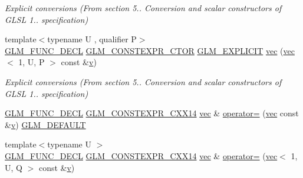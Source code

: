 \begin{DoxyCompactItemize}
\begin{DoxyCompactList}\small\item\em Explicit conversions (From section 5.. Conversion and scalar constructors of G\+L\+SL 1.. specification) \end{DoxyCompactList}\item 
{\footnotesize template$<$typename U , qualifier P$>$ }\\\mbox{\hyperlink{setup_8hpp_ab2d052de21a70539923e9bcbf6e83a51}{G\+L\+M\+\_\+\+F\+U\+N\+C\+\_\+\+D\+E\+CL}} \mbox{\hyperlink{setup_8hpp_ad34178a09666081abdb573c14d1f4a5a}{G\+L\+M\+\_\+\+C\+O\+N\+S\+T\+E\+X\+P\+R\+\_\+\+C\+T\+OR}} \mbox{\hyperlink{setup_8hpp_a6c74f5a5e7b134ab69023ff9a30d4d5d}{G\+L\+M\+\_\+\+E\+X\+P\+L\+I\+C\+IT}} \mbox{\hyperlink{structglm_1_1vec_3_011_00_01_t_00_01_q_01_4_abd93e6bf42d506d85f4aea0c5d92ecc2}{vec}} (\mbox{\hyperlink{structglm_1_1vec}{vec}}$<$ 1, U, P $>$ const \&\mbox{\hyperlink{_s_d_l__opengl_8h_a10a82eabcb59d2fcd74acee063775f90}{v}})
\begin{DoxyCompactList}\small\item\em Explicit conversions (From section 5.. Conversion and scalar constructors of G\+L\+SL 1.. specification) \end{DoxyCompactList}\item 
\mbox{\hyperlink{setup_8hpp_ab2d052de21a70539923e9bcbf6e83a51}{G\+L\+M\+\_\+\+F\+U\+N\+C\+\_\+\+D\+E\+CL}} \mbox{\hyperlink{setup_8hpp_a4dd12abf5e1164bc57f3a34671d03844}{G\+L\+M\+\_\+\+C\+O\+N\+S\+T\+E\+X\+P\+R\+\_\+\+C\+X\+X14}} \mbox{\hyperlink{structglm_1_1vec}{vec}} \& \mbox{\hyperlink{structglm_1_1vec_3_011_00_01_t_00_01_q_01_4_ac0ab0e9e96caa507674d12526367ea11}{operator=}} (\mbox{\hyperlink{structglm_1_1vec}{vec}} const \&\mbox{\hyperlink{_s_d_l__opengl_8h_a10a82eabcb59d2fcd74acee063775f90}{v}}) \mbox{\hyperlink{setup_8hpp_aefce7051c376a64ba89fa93a9f63bc2c}{G\+L\+M\+\_\+\+D\+E\+F\+A\+U\+LT}}
\item 
{\footnotesize template$<$typename U $>$ }\\\mbox{\hyperlink{setup_8hpp_ab2d052de21a70539923e9bcbf6e83a51}{G\+L\+M\+\_\+\+F\+U\+N\+C\+\_\+\+D\+E\+CL}} \mbox{\hyperlink{setup_8hpp_a4dd12abf5e1164bc57f3a34671d03844}{G\+L\+M\+\_\+\+C\+O\+N\+S\+T\+E\+X\+P\+R\+\_\+\+C\+X\+X14}} \mbox{\hyperlink{structglm_1_1vec}{vec}} \& \mbox{\hyperlink{structglm_1_1vec_3_011_00_01_t_00_01_q_01_4_a2ebfdb3250071dc75ee92e29fbbf0062}{operator=}} (\mbox{\hyperlink{structglm_1_1vec}{vec}}$<$ 1, U, Q $>$ const \&\mbox{\hyperlink{_s_d_l__opengl_8h_a10a82eabcb59d2fcd74acee063775f90}{v}})

\end{DoxyCompactItemize}
